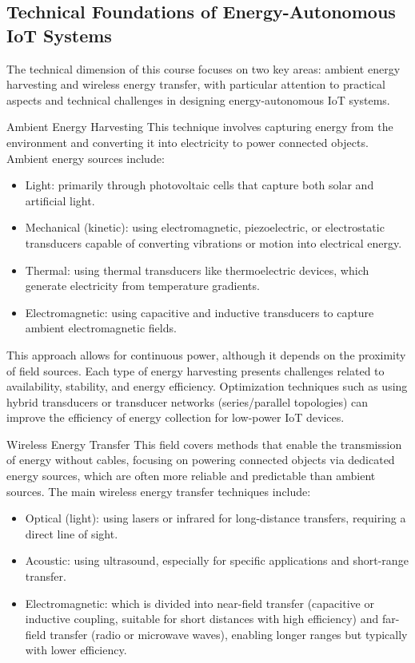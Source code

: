 \subsection{Technical Foundations of Energy-Autonomous IoT Systems}

The technical dimension of this course focuses on two key areas: ambient energy harvesting and wireless energy transfer, with particular attention to practical aspects and technical challenges in designing energy-autonomous IoT systems.

Ambient Energy Harvesting
This technique involves capturing energy from the environment and converting it into electricity to power connected objects. Ambient energy sources include:

\begin{itemize}
    \item Light: primarily through photovoltaic cells that capture both solar and artificial light.
    \item Mechanical (kinetic): using electromagnetic, piezoelectric, or electrostatic transducers capable of converting vibrations or motion into electrical energy.
    \item Thermal: using thermal transducers like thermoelectric devices, which generate electricity from temperature gradients.
    \item Electromagnetic: using capacitive and inductive transducers to capture ambient electromagnetic fields.
\end{itemize}


This approach allows for continuous power, although it depends on the proximity of field sources. Each type of energy harvesting presents challenges related to availability, stability, and energy efficiency. Optimization techniques such as using hybrid transducers or transducer networks (series/parallel topologies) can improve the efficiency of energy collection for low-power IoT devices.

Wireless Energy Transfer
This field covers methods that enable the transmission of energy without cables, focusing on powering connected objects via dedicated energy sources, which are often more reliable and predictable than ambient sources. The main wireless energy transfer techniques include:

\begin{itemize}
\item Optical (light): using lasers or infrared for long-distance transfers, requiring a direct line of sight.
\item Acoustic: using ultrasound, especially for specific applications and short-range transfer.
\item Electromagnetic: which is divided into near-field transfer (capacitive or inductive coupling, suitable for short distances with high efficiency) and far-field transfer (radio or microwave waves), enabling longer ranges but typically with lower efficiency.
\end{itemize}


